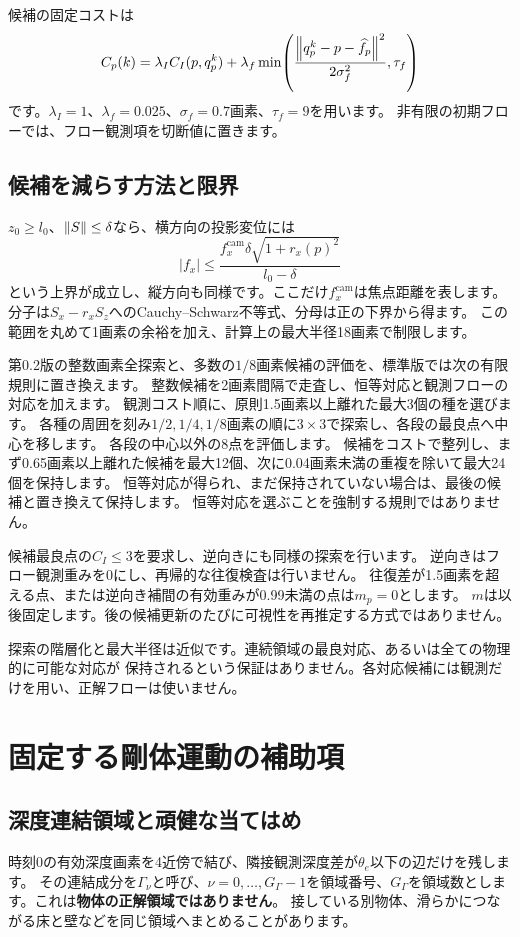 \documentclass[a4paper,11pt]{ltjsarticle}
\theoremstyle{definition}
\begin{document}
候補の固定コストは
\begin{equation}\label{eq:cost}
C_p(k)=\lambda_I C_I(p,q_p^k)+\lambda_f
\min\!\left(\frac{\left\lVert q_p^k-p-\widehat f_p\right\rVert^2}{2\sigma_f^2},\tau_f\right)
\end{equation}
です。$\lambda_I=1$、$\lambda_f=0.025$、$\sigma_f=0.7$画素、$\tau_f=9$を用います。
非有限の初期フローでは、フロー観測項を切断値に置きます。

\subsection{候補を減らす方法と限界}
$z_0\ge l_0$、$\left\lVert S\right\rVert\le\delta$なら、横方向の投影変位には
\begin{equation}\label{eq:radius}
|f_x|\le\frac{f_x^{\mathrm{cam}}\delta\sqrt{1+r_x(p)^2}}{l_0-\delta}
\end{equation}
という上界が成立し、縦方向も同様です。ここだけ$f_x^{\mathrm{cam}}$は焦点距離を表します。
分子は$S_x-r_xS_z$へのCauchy--Schwarz不等式、分母は正の下界から得ます。
この範囲を丸めて1画素の余裕を加え、計算上の最大半径18画素で制限します。

第0.2版の整数画素全探索と、多数の$1/8$画素候補の評価を、標準版では次の有限規則に置き換えます。
整数候補を2画素間隔で走査し、恒等対応と観測フローの対応を加えます。
観測コスト順に、原則1.5画素以上離れた最大3個の種を選びます。
各種の周囲を刻み$1/2,1/4,1/8$画素の順に$3\times3$で探索し、各段の最良点へ中心を移します。
各段の中心以外の8点を評価します。
候補をコストで整列し、まず0.65画素以上離れた候補を最大12個、次に0.04画素未満の重複を除いて最大24個を保持します。
恒等対応が得られ、まだ保持されていない場合は、最後の候補と置き換えて保持します。
恒等対応を選ぶことを強制する規則ではありません。

候補最良点の$C_I\le3$を要求し、逆向きにも同様の探索を行います。
逆向きはフロー観測重みを0にし、再帰的な往復検査は行いません。
往復差が1.5画素を超える点、または逆向き補間の有効重みが0.99未満の点は$m_p=0$とします。
$m$は以後固定します。後の候補更新のたびに可視性を再推定する方式ではありません。

探索の階層化と最大半径は近似です。連続領域の最良対応、あるいは全ての物理的に可能な対応が
保持されるという保証はありません。各対応候補には観測だけを用い、正解フローは使いません。

\section{固定する剛体運動の補助項}
\subsection{深度連結領域と頑健な当てはめ}
時刻0の有効深度画素を4近傍で結び、隣接観測深度差が$\theta_e$以下の辺だけを残します。
その連結成分を$\Gamma_\nu$と呼び、$\nu=0,\ldots,G_\Gamma-1$を領域番号、$G_\Gamma$を領域数とします。これは\textbf{物体の正解領域ではありません}。
接している別物体、滑らかにつながる床と壁などを同じ領域へまとめることがあります。
\end{document}

